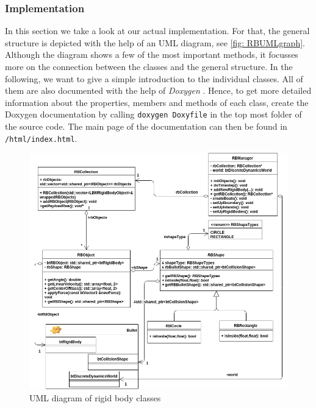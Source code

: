 \subsubsection{Implementation}
In this section we take a look at our actual implementation. For that, the general structure is depicted with the help of an UML diagram, see \autoref{fig: RBUMLgraph}. Although the diagram shows a few of the most important methods, it focusses more on the connection between the classes and the general structure. In the following, we want to give a simple introduction to the individual classes. All of them are also documented with the help of \emph{Doxygen} \cite{Doxygen}. Hence, to get more detailed information about the properties, members and methods of each class, create the Doxygen documentation by calling \texttt{doxygen Doxyfile} in the top most folder of the source code. The main page of the documentation can then be found in \texttt{/html/index.html}.
\begin{figure}[ht]
\centering
\includegraphics[scale=0.42]{img/RigidBodies/RigidBodyUML.png}
\caption{UML diagram of rigid body classes}
\label{fig: RBUMLgraph}
\end{figure}


